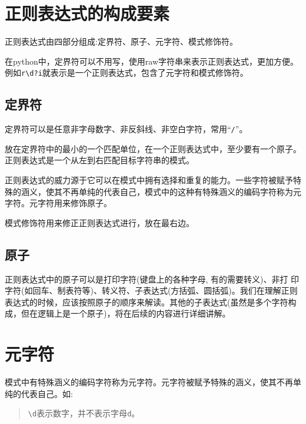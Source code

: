 \documentclass[]{ctexbook}
\begin{document}
\hypertarget{ux6b63ux5219ux8868ux8fbeux5f0fux7684ux6784ux6210ux8981ux7d20}{%
\section{正则表达式的构成要素}\label{ux6b63ux5219ux8868ux8fbeux5f0fux7684ux6784ux6210ux8981ux7d20}}

正则表达式由四部分组成:定界符、原子、元字符、模式修饰符。

在python中，定界符可以不用写，使用raw字符串来表示正则表达式，更加方便。例如\texttt{r\textquotesingle{}\textbackslash{}d?i\textquotesingle{}}就表示是一个正则表达式，包含了元字符和模式修饰符。

\hypertarget{ux5b9aux754cux7b26}{%
\subsection{定界符}\label{ux5b9aux754cux7b26}}

定界符可以是任意非字母数字、非反斜线、非空白字符，常用``\texttt{/}''。

放在定界符中的最小的一个匹配单位，在一个正则表达式中，至少要有一个原子。正则表达式是一个从左到右匹配目标字符串的模式。

正则表达式的威力源于它可以在模式中拥有选择和重复的能力。一些字符被赋予特殊的涵义，使其不再单纯的代表自己，模式中的这种有特殊涵义的编码字符称为元字符。元字符用来修饰原子。

模式修饰符用来修正正则表达式进行，放在最右边。

\hypertarget{ux539fux5b50}{%
\subsection{原子}\label{ux539fux5b50}}

正则表达式中的原子可以是打印字符(键盘上的各种字母, 有的需要转义)、非打
印字符(如回车、制表符等)、转义符、子表达式(方括弧、圆括弧)。我们在理解正则表达式的时候，应该按照原子的顺序来解读。其他的子表达式(虽然是多个字符构成，但在逻辑上是一个原子)，将在后续的内容进行详细讲解。

\hypertarget{ux5143ux5b57ux7b26}{%
\section{元字符}\label{ux5143ux5b57ux7b26}}

模式中有特殊涵义的编码字符称为元字符。元字符被赋予特殊的涵义，使其不再单纯的代表自己。如:

\begin{quote}
\texttt{\textbackslash{}d}表示数字，并不表示字母\texttt{d}。
\end{quote}
\end{document}
